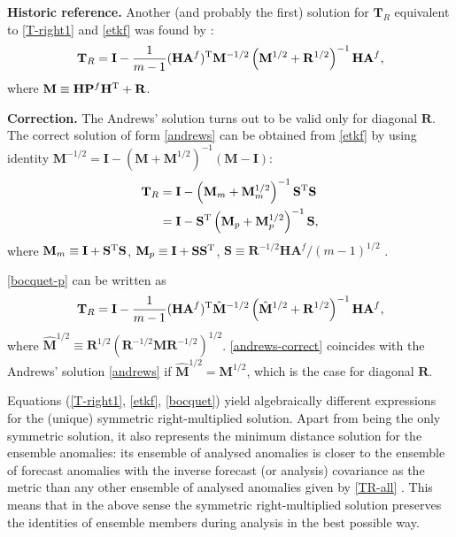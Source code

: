 \documentclass[11pt]{report}
\newcommand{\mb} {\mathbf}
\newcommand{\T}{^{\tiny \mathrm T}}
\begin{document}
{
  \scriptsize
  {\bf Historic reference.} Another (and probably the first) solution for $\mb T_R$ equivalent to \eqref{T-right1} and \eqref{etkf} was found by \citet{and68a}:
  \setlength{\abovedisplayskip}{1pt}
  \setlength{\belowdisplayskip}{3pt}
  \begin{align}
    \label{andrews}
    \mb T_R = \mb I - \frac{1}{m-1} (\mb H \mb A^f)\T \mb M^{-1/2} \left(\mb M^{1/2} + \mb R^{1/2}\right)^{-1} \mb H \mb A^f,
  \end{align}
  where $\mb M \equiv \mb H \mb P^f \mb H\T + \mb R$.
}

{
  \scriptsize
  {\bf Correction.} The Andrews' solution turns out to be valid only for diagonal $\mb R$.
  The correct solution of form \eqref{andrews} can be obtained from \eqref{etkf} by using identity $\mb M^{-1/2} = \mb I - (\mb M + \mb M^{1/2})^{-1}(\mb M - \mb I)$:
  \setlength{\abovedisplayskip}{1pt}
  \setlength{\belowdisplayskip}{3pt}
  \begin{subequations}
    \label{bocquet}
    \begin{align}
      \mb T_R &= \mb I - \left(\mb M_m + \mb M_m^{1/2}\right)^{-1} \mb S\T \mb S\\
      \label{bocquet-p}
      &= \mb I - \mb S\T \left(\mb M_p + \mb M_p^{1/2}\right)^{-1} \mb S,
    \end{align}
 \end{subequations}
  where $\mb M_m \equiv \mb I + \mb S\T \mb S$, $\mb M_p \equiv \mb I + \mb S \mb S\T$, $\mb S \equiv \mb R^{-1/2} \mb H \mb A^f / (m - 1)^{1/2}$ \citep{boc16a}.

  \eqref{bocquet-p} can be written as
  \begin{align}
    \label{andrews-correct}
    \mb T_R = \mb I - \frac{1}{m-1} (\mb H \mb A^f)\T \hat{\mb M}^{-1/2} \left(\hat{\mb M}^{1/2} + \mb R^{1/2}\right)^{-1} \mb H \mb A^f,
  \end{align}
  where $\hat{\mb M}^{1/2} \equiv \mb R^{1/2} (\mb R^{-1/2} \mb M \mb R^{-1/2})^{1/2}$.
\eqref{andrews-correct} coincides with the Andrews' solution \eqref{andrews} if $\hat{\mb M}^{1/2} = \mb M^{1/2}$, which is the case for diagonal $\mb R$.
}

Equations (\ref{T-right1}, \ref{etkf}, \ref{bocquet}) yield algebraically different expressions for the (unique) symmetric right-multiplied solution.
Apart from being the only symmetric solution, it also represents the minimum distance solution for the ensemble anomalies: its ensemble of analysed anomalies is closer to the ensemble of forecast anomalies with the inverse forecast (or analysis) covariance as the metric than any other ensemble of analysed anomalies given by \eqref{TR-all} \citep{ott03a}.
This means that in the above sense the symmetric right-multiplied solution preserves the identities of ensemble members during analysis in the best possible way.
\end{document}
